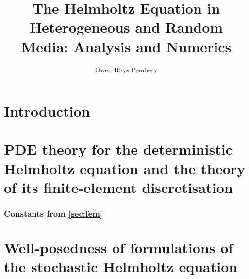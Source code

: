 \documentclass[11pt,draft]{book}
\title{The Helmholtz Equation in Heterogeneous and Random Media: Analysis and Numerics}
\author{Owen Rhys Pembery}
\begin{document}


\maketitle

\makeaftertitle




\tableofcontents

\listoffigures
\listoftables
\listofalgorithms

\chapter{Introduction}\label{chap:intro}


\chapter{PDE theory for the deterministic Helmholtz equation and the theory of its finite-element discretisation}\label{chap:background}





\subsection{Constants from \cref{sec:fem}}\label{app:constants}


%

%

\chapter{Well-posedness of formulations of the sto\-chas\-tic Helmholtz equation}\label{chap:stochastic}

 








\end{document}
